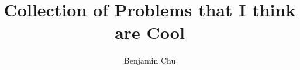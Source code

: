 \documentclass[some_latex_template.tex]{subfiles}
\begin{document}
\title{Collection of Problems that I think are Cool}
\author{Benjamin Chu}
\maketitle








\end{document}
